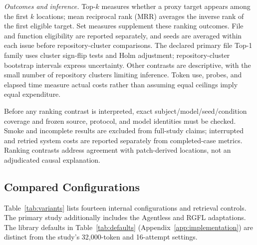 \documentclass[letterpaper,journal]{IEEEtran}
\begin{document}
\emph{Outcomes and inference.} Top-$k$ measures whether a proxy target appears among the first $k$ locations; mean reciprocal rank (MRR) averages the inverse rank of the first eligible target. Set measures supplement these ranking outcomes. File and function eligibility are reported separately, and seeds are averaged within each issue before repository-cluster comparisons. The declared primary file Top-1 family uses cluster sign-flip tests and Holm adjustment; repository-cluster bootstrap intervals express uncertainty. Other contrasts are descriptive, with the small number of repository clusters limiting inference. Token use, probes, and elapsed time measure actual costs rather than assuming equal ceilings imply equal expenditure.

Before any ranking contrast is interpreted, exact subject/model/seed/condition coverage and frozen source, protocol, and model identities must be checked. Smoke and incomplete results are excluded from full-study claims; interrupted and retried system costs are reported separately from completed-case metrics. Ranking contrasts address agreement with patch-derived locations, not an adjudicated causal explanation.

\subsection{Compared Configurations}\label{sec:variants}
Table~\ref{tab:variants} lists fourteen internal configurations and retrieval controls. The primary study additionally includes the Agentless and RGFL adaptations. The library defaults in Table~\ref{tab:defaults} (Appendix~\ref{app:implementation}) are distinct from the study's 32,000-token and 16-attempt settings.
\end{document}
